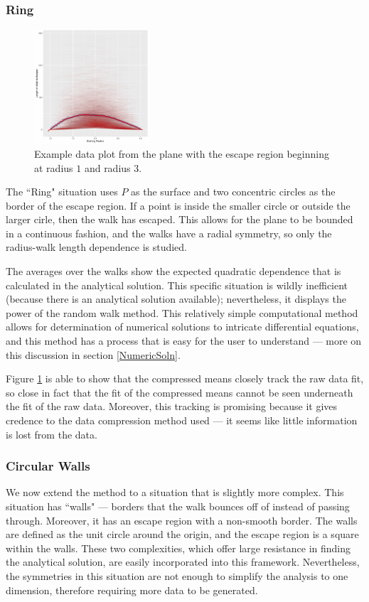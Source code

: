 \documentclass[12pt]{article}
\begin{document}
		\subsubsection{Ring}
			\begin{figure}[htp]
				\centering
				\includegraphics[width=0.38\textwidth]{images/Plane_In1_Out3_N1000_S005.pdf}
				\caption{Example data plot from the plane with the escape region beginning at radius $1$ and radius $3$.}
				\label{fig:planering}
			\end{figure}
			The ``Ring" situation uses $P$ as the surface and two concentric circles as the border of the escape region.
			If a point is inside the smaller circle or outside the larger cirle, then the walk has escaped.
			This allows for the plane to be bounded in a continuous fashion, and the walks have a radial symmetry, so only the radius-walk length dependence is studied.
			
			The averages over the walks show the expected quadratic dependence that is calculated in the analytical solution.
			This specific situation is wildly inefficient (because there is an analytical solution available); nevertheless, it displays the power of the random walk method.
			This relatively simple computational method allows for determination of numerical solutions to intricate differential equations, and this method has a process that is easy for the user to understand --- more on this discussion in section \ref{NumericSoln}.
			
			Figure \ref{fig:planering} is able to show that the compressed means closely track the raw data fit, so close in fact that the fit of the compressed means cannot be seen underneath the fit of the raw data.
			Moreover, this tracking is promising because it gives credence to the data compression method used --- it seems like little information is lost from the data.
			
		\subsubsection{Circular Walls}
			We now extend the method to a situation that is slightly more complex.
			This situation has ``walls" --- borders that the walk bounces off of instead of passing through.
			Moreover, it has an escape region with a non-smooth border.
			The walls are defined as the unit circle around the origin, and the escape region is a square within the walls.
			These two complexities, which offer large resistance in finding the analytical solution, are easily incorporated into this framework.
			Nevertheless, the symmetries in this situation are not enough to simplify the analysis to one dimension, therefore requiring more data to be generated.
			
\end{document}
